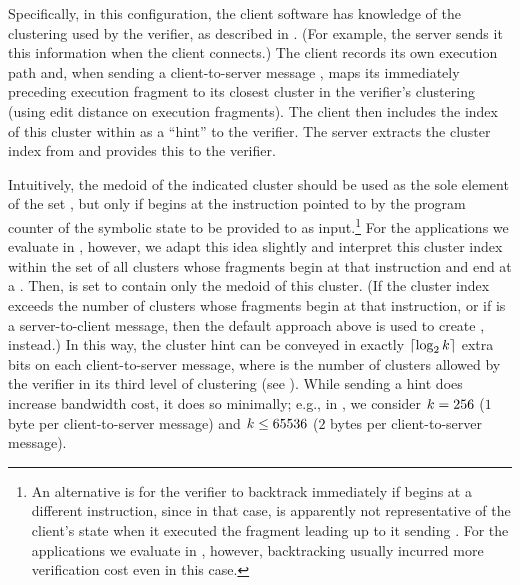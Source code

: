 Specifically, in this configuration, the client software has knowledge
of the clustering used by the verifier, as described in
.  (For example, the server sends it
this information when the client connects.)  The client records its
own execution path and, when sending a client-to-server message
\msg{\msgNmbr}, maps its immediately preceding execution fragment to
its closest cluster in the verifier's clustering (using edit distance
on execution fragments).  The client then includes the index of this
cluster within \msg{\msgNmbr} as a ``hint'' to the verifier.  The
server extracts the cluster index from \msg{\msgNmbr} and provides
this to the verifier.

Intuitively, the medoid \trainingFrag of the indicated cluster should
be used as the sole element of the set \trainingFrags{\msgNmbr}, but
only if \trainingFrag begins at the instruction pointed to by the
program counter of the symbolic state  to be
provided to \verifyAlg as input.\footnote{An alternative is for the
verifier to backtrack immediately if \trainingFrag begins at a
different instruction, since in that case,  is
apparently not representative of the client's state when it executed
the fragment leading up to it sending \msg{\msgNmbr}.  For the
applications we evaluate in , however, backtracking
usually incurred more verification cost even in this case.}  For the
applications we evaluate in , however, we adapt this
idea slightly and interpret this cluster index within the set of all
clusters whose fragments begin at that instruction and end at a \sendInstr.  Then,
\trainingFrags{\msgNmbr} is set to contain only the medoid of
this cluster.  (If the cluster index exceeds the number of clusters
whose fragments begin at that instruction, or if \msg{\msgNmbr} is a
server-to-client message, then the default approach above is used to
create \trainingFrags{\msgNmbr}, instead.)  In this way, the cluster
hint can be conveyed in exactly $\lceil\log_2 k\rceil$ extra
bits on each client-to-server message, where \clusters is the number
of clusters allowed by the verifier in its third level of clustering
(see ).  While sending a hint does
increase bandwidth cost, it does so minimally; e.g., in
, we consider $k = 256$ ($1$ byte per
client-to-server message) and $k \le 65536$ ($2$ bytes per
client-to-server message).

